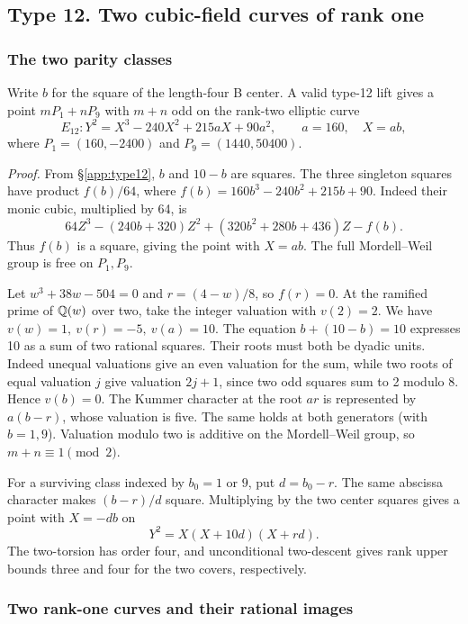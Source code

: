 \subsection{Type 12. Two cubic-field curves of rank one}\label{detail:type12}

\subsubsection{The two parity classes}\label{arith:61}

Write \(b\) for the square of the length-four B center.
A valid type-12 lift gives a point \(mP_1+nP_9\) with \(m+n\) odd on the
rank-two elliptic curve
\[E_{12}:Y^2=X^3-240X^2+215aX+90a^2,\qquad a=160,\quad X=ab,\]
where \(P_1=(160,-2400)\) and \(P_9=(1440,50400)\).

\emph{Proof.} From \S\ref{app:type12}, \(b\) and \(10-b\) are squares. The three
singleton squares have product \(f(b)/64\), where
\(f(b)=160b^3-240b^2+215b+90\). Indeed their monic cubic, multiplied
by 64, is
\[64Z^3-(240b+320)Z^2+(320b^2+280b+436)Z-f(b).\]
Thus \(f(b)\) is a square, giving the point with \(X=ab\).
The full Mordell--Weil group is free on \(P_1,P_9\).

Let \(w^3+38w-504=0\) and \(r=(4-w)/8\), so \(f(r)=0\).
At the ramified prime of \(\mathbb Q(w)\) over two, take the integer
valuation with \(v(2)=2\). We have \(v(w)=1,\ v(r)=-5,\ v(a)=10\).
The equation \(b+(10-b)=10\) expresses 10 as a sum of two rational
squares. Their roots must both be dyadic units. Indeed unequal
valuations give an even valuation for the sum, while two roots of equal
valuation \(j\) give valuation \(2j+1\), since two odd squares sum to
2 modulo 8. Hence \(v(b)=0\). The Kummer character at the root \(ar\)
is represented by \(a(b-r)\), whose valuation is five. The same holds
at both generators (with \(b=1,9\)). Valuation modulo two is additive
on the Mordell--Weil group, so \(m+n\equiv1\pmod2\).

For a surviving class indexed by \(b_0=1\) or \(9\), put \(d=b_0-r\).
The same abscissa character makes \((b-r)/d\) square. Multiplying by the
two center squares gives a point with \(X=-db\) on
\[Y^2=X(X+10d)(X+rd).\]
The two-torsion has order four, and unconditional two-descent gives
rank upper bounds three and four for the two covers, respectively.

\subsubsection{Two rank-one curves and their rational images}\label{arith:62}

